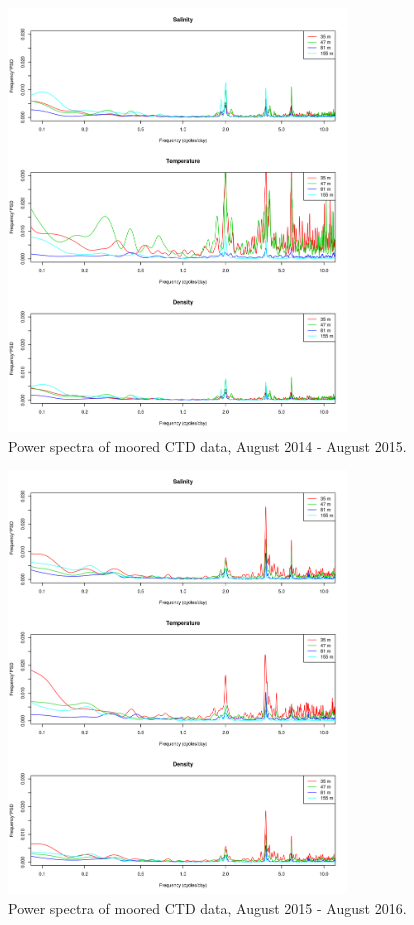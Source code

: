 \documentclass[12pt]{dforeport}
\begin{document}
\begin{figure}
\centering
\includegraphics[width = 0.8\textwidth]{./figures/13_mctd_ps_2014_2015.png}
\caption[Power spectra of moored CTD, 2014-2015]{Power spectra of moored CTD data, August 2014 - August 2015.}
\label{f:mctd_ps_2014_2015}
\end{figure}

\begin{figure}  
\centering
\includegraphics[width = 0.8\textwidth]{./figures/14_mctd_ps_2015_2016.png}
\caption[Power spectra of moored CTD, 2015-2016]{Power spectra of moored CTD data, August 2015 - August 2016.}
\label{f:mctd_ps_2015_2016}
\end{figure}
\end{document}
